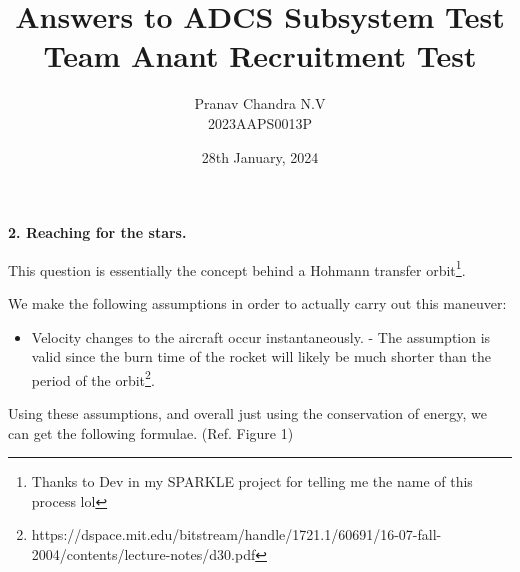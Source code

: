 \documentclass[a4paper, 12pt]{exam}
\title{
	{Answers to ADCS Subsystem Test} \\
	\textbf{\large Team Anant Recruitment Test}\\
	\vspace{0.75cm}
}
\date{28th January, 2024}
\author{Pranav Chandra N.V \\ 2023AAPS0013P}
\begin{document}
	\maketitle
	\newpage
	
	{\large\textbf{2. Reaching for the stars.}}
		
		This question is essentially the concept behind a Hohmann transfer orbit\footnote{Thanks to Dev in my SPARKLE project for telling me the name of this process lol}.
		
		We make the following assumptions in order to actually carry out this maneuver:
		\begin{itemize}
			\item Velocity changes to the aircraft occur instantaneously. - The assumption is valid since the burn time of the rocket will likely be much shorter than the period of the orbit\footnote{https://dspace.mit.edu/bitstream/handle/1721.1/60691/16-07-fall-2004/contents/lecture-notes/d30.pdf}.
		\end{itemize}
		
		Using these assumptions, and overall just using the conservation of energy, we can get the following formulae. (Ref. Figure 1)
		
\end{document}

